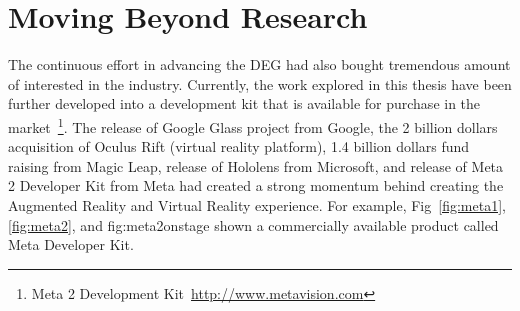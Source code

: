 \section{Moving Beyond Research} 


The continuous effort in advancing the DEG had also bought tremendous amount of interested in the industry. Currently, the work explored in this thesis have been further developed into a development kit that is available for purchase in the market~\footnote{Meta 2 Development Kit~\url{http://www.metavision.com}}. The release of Google Glass project from Google, the 2 billion dollars acquisition of Oculus Rift (virtual reality platform), 1.4 billion dollars fund raising from Magic Leap, release of Hololens from Microsoft, and release of Meta 2 Developer Kit from Meta had created a strong momentum behind creating the Augmented Reality and Virtual Reality experience. For example, Fig~\ref{fig:meta1}, \ref{fig:meta2}, and {fig:meta2onstage} shown a commercially available product called Meta Developer Kit. 

